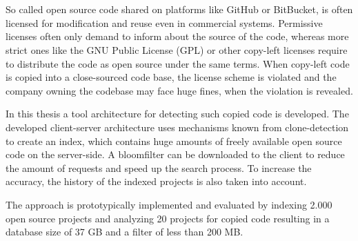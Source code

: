 \chapter{\abstractname}

So called open source code shared on platforms like GitHub or BitBucket, is often licensed for modification and reuse even in commercial systems.
Permissive licenses often only demand to inform about the source of the code, whereas more strict ones like the GNU Public License (GPL) or other copy-left licenses require to distribute the code as open source under the same terms.
When copy-left code is copied into a close-sourced code base, the license scheme is violated and the company owning the codebase may face huge fines, when the violation is revealed.

In this thesis a tool architecture for detecting such copied code is developed.
The developed client-server architecture uses mechanisms known from clone-detection to create an index, which contains huge amounts of freely available open source code on the server-side.
A bloomfilter can be downloaded to the client to reduce the amount of requests and speed up the search process.
To increase the accuracy, the history of the indexed projects is also taken into account.

The approach is prototypically implemented and evaluated by indexing 2.000 open source projects and analyzing 20 projects for copied code resulting in a database size of 37 GB and a filter of less than 200 MB.

